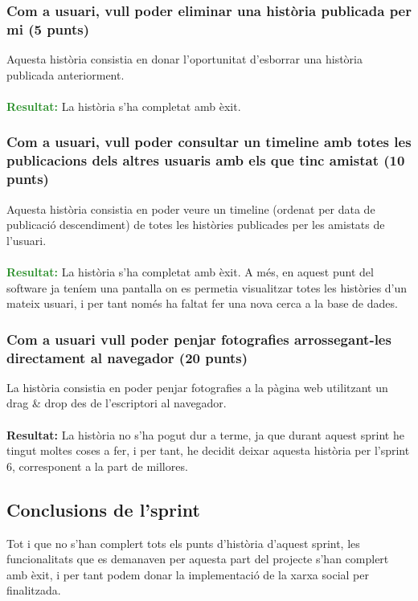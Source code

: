 \documentclass[11pt,catalan,listoffigures,listoftables]{tfgetsinf}
\begin{document}
\subsubsection{Com a usuari, vull poder eliminar una història publicada per mi (5 punts)}

Aquesta història consistia en donar l'oportunitat d'esborrar una història publicada anteriorment.\\ \\
\textcolor{forestgreen}{\textbf{Resultat:}} La història s'ha completat amb èxit.

\subsubsection{Com a usuari, vull poder consultar un timeline amb totes les publicacions dels altres usuaris amb els que tinc amistat (10 punts)}

Aquesta història consistia en poder veure un timeline (ordenat per data de publicació descendiment) de totes les històries publicades per les amistats de l'usuari.\\ \\
\textcolor{forestgreen}{\textbf{Resultat:}} La història s'ha completat amb èxit. A més, en aquest punt del software ja teníem una pantalla on es permetia visualitzar totes les històries d'un mateix usuari, i per tant només ha faltat fer una nova cerca a la base de dades.

\subsubsection{Com a usuari vull poder penjar fotografies arrossegant-les directament al navegador (20 punts)}

La història consistia en poder penjar fotografies a la pàgina web utilitzant un drag \& drop des de l'escriptori al navegador.\\ \\
\textcolor{costumyellow}{\textbf{Resultat:}} La història no s'ha pogut dur a terme, ja que durant aquest sprint he tingut moltes coses a fer, i per tant, he decidit deixar aquesta història per l'sprint 6, corresponent a la part de millores.

\subsection{Conclusions de l'sprint}

Tot i que no s'han complert tots els punts d'història d'aquest sprint, les funcionalitats que es demanaven per aquesta part del projecte s'han complert amb èxit, i per tant podem donar la implementació de la xarxa social per finalitzada.
\end{document}
